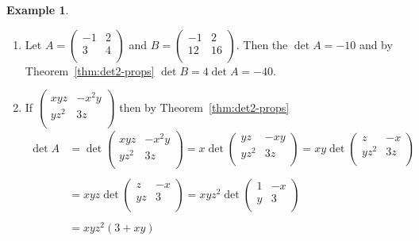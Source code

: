 \documentclass[11pt,a4paper]{article}
\theoremstyle{definition}
\newtheorem{exa}[thm]{Example}
\begin{document}
\begin{exa}
\begin{enumerate}
\item Let $A=
\begin{pmatrix}
-1&2\\3&4\\
\end{pmatrix}
$ and $B=
\begin{pmatrix}
-1&2\\12&16\\
\end{pmatrix}
$. Then the $\det A=-10$ and by Theorem~\ref{thm:det2-props} $\det B=4\det A=-40$.
\item If $
\begin{pmatrix}
xyz&-x^2y\\yz^2&3z\\
\end{pmatrix}
$ then by Theorem~\ref{thm:det2-props}
\begin{align*}
\det A &=\det
\begin{pmatrix}
xyz&-x^2y\\yz^2&3z\\
\end{pmatrix}
=x\det
\begin{pmatrix}
yz&-xy\\yz^2&3z\\
\end{pmatrix}
=xy\det
\begin{pmatrix}
z&-x\\yz^2&3z\\
\end{pmatrix}\\\\
&=xyz\det
\begin{pmatrix}
z&-x\\yz&3\\
\end{pmatrix}
=xyz^2\det
\begin{pmatrix}
1&-x\\y&3\\
\end{pmatrix}\\\\
&=xyz^2(3+xy)\\
\end{align*}
\end{enumerate}



\end{exa}
\end{document}
